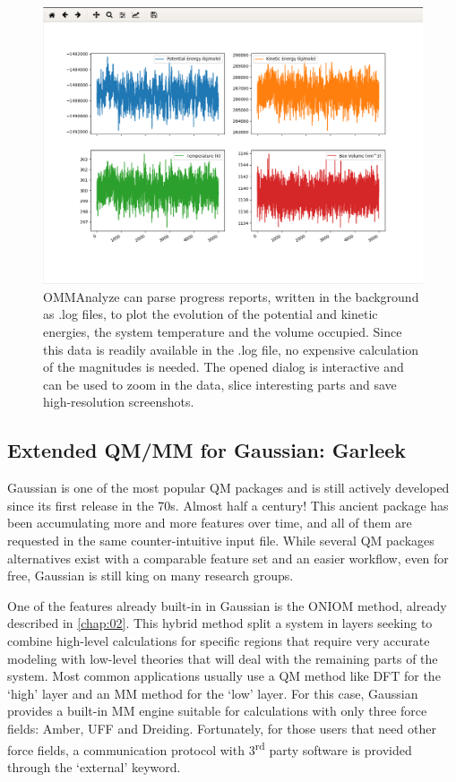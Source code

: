 \begin{figure}[H] %
	\begin{Center}
		\includegraphics[width=\textwidth]{./figures/05/ommanalyze.png}
	\end{Center}
	\caption[Example results with OMMAnalyze]{OMMAnalyze can parse progress reports, written in the background as .log files, to plot the evolution of the potential and kinetic energies, the system temperature and the volume occupied. Since this data is readily available in the .log file, no expensive calculation of the magnitudes is needed. The opened dialog is interactive and can be used to zoom in the data, slice interesting parts and save high-resolution screenshots.}
	\label{fig:ommanalyze}
\end{figure}


\subsection{Extended QM/MM for Gaussian: Garleek}


Gaussian is one of the most popular QM packages and is still actively developed since its first release in the 70s. Almost half a century! This ancient package has been accumulating more and more features over time, and all of them are requested in the same counter-intuitive input file. While several QM packages alternatives exist with a comparable feature set and an easier workflow, even for free, Gaussian is still king on many research groups.

One of the features already built-in in Gaussian is the ONIOM method, already described in \autoref{chap:02}. This hybrid method split a system in layers seeking to combine high-level calculations for specific regions that require very accurate modeling with low-level theories that will deal with the remaining parts of the system. Most common applications usually use a QM method like DFT for the ‘high’ layer and an MM method for the ‘low’ layer. For this case, Gaussian provides a built-in MM engine suitable for calculations with only three force fields: Amber, UFF and Dreiding. Fortunately, for those users that need other force fields, a communication protocol with 3\textsuperscript{rd} party software is provided through the ‘external’ keyword.

